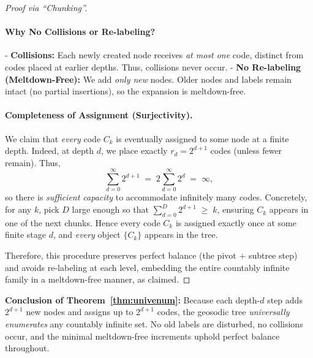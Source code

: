 \begin{proof}[Proof via ``Chunking'']
\paragraph{Why No Collisions or Re-labeling?}
- \textbf{Collisions:} Each newly created node receives \emph{at most one} code, 
  distinct from codes placed at earlier depths. Thus, collisions never occur.
- \textbf{No Re-labeling (Meltdown-Free):} We add \emph{only new} nodes. 
  Older nodes and labels remain intact (no partial insertions), so the expansion is meltdown-free.

\paragraph{Completeness of Assignment (Surjectivity).}
We claim that \emph{every} code $C_k$ is eventually assigned to some node at a finite depth.
Indeed, at depth $d$, we place exactly $r_d = 2^{d+1}$ codes (unless fewer remain). Thus,
\[
  \sum_{d=0}^{\infty} 2^{d+1} 
  \;=\; 
  2 \sum_{d=0}^{\infty} 2^d 
  \;=\; 
  \infty,
\]
so there is \emph{sufficient capacity} to accommodate infinitely many codes. 
Concretely, for any $k$, pick $D$ large enough so that 
$\sum_{d=0}^D 2^{d+1} \;\ge\; k$, ensuring $C_k$ appears in one of the next chunks. 
Hence every code $C_k$ is assigned exactly once at some finite stage $d$, 
and \emph{every} object $\{C_k\}$ appears in the tree.

\smallskip
\noindent
Therefore, this procedure preserves perfect balance (the pivot + subtree step) 
and avoids re-labeling at each level, embedding the entire countably infinite family 
in a meltdown-free manner, as claimed.
\end{proof}

\noindent
\textbf{Conclusion of Theorem~\ref{thm:univenum}:}
Because each depth-$d$ step adds $2^{d+1}$ new nodes and assigns up to $2^{d+1}$ codes,
the geosodic tree \emph{universally enumerates} any countably infinite set. 
No old labels are disturbed, no collisions occur, and the minimal meltdown-free increments 
uphold perfect balance throughout.

